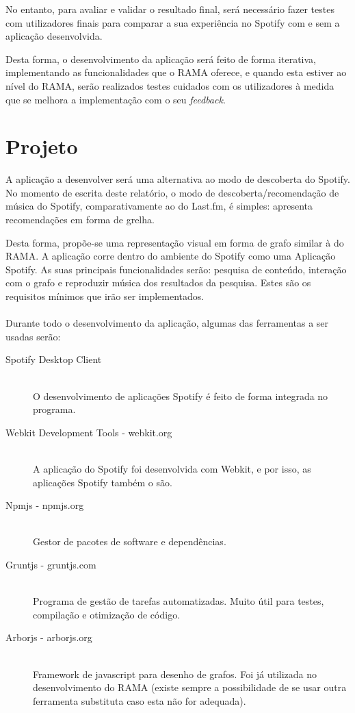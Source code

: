 No entanto, para avaliar e validar o resultado final, será necessário fazer testes com utilizadores finais para comparar a sua experiência no Spotify com e sem a aplicação desenvolvida.

Desta forma, o desenvolvimento da aplicação será feito de forma iterativa, implementando as funcionalidades que o RAMA oferece, e quando esta estiver ao nível do RAMA, serão realizados testes cuidados com os utilizadores à medida que se melhora a implementação com o seu \emph{feedback}.

\section{Projeto} \label{sec:proj}

A aplicação a desenvolver será uma alternativa ao modo de descoberta do Spotify.
No momento de escrita deste relatório, o modo de descoberta/recomendação de música do Spotify, comparativamente ao do Last.fm, é simples: apresenta recomendações em forma de grelha.

Desta forma, propõe-se uma representação visual em forma de grafo similar à do RAMA.
A aplicação corre dentro do ambiente do Spotify como uma Aplicação Spotify.
As suas principais funcionalidades serão: pesquisa de conteúdo, interação com o grafo e reproduzir música dos resultados da pesquisa.
Estes são os requisitos mínimos que irão ser implementados.
\\
\\
Durante todo o desenvolvimento da aplicação, algumas das ferramentas a ser usadas serão:

\begin{description}
  \item[Spotify Desktop Client] \hfill \\
    O desenvolvimento de aplicações Spotify é feito de forma integrada no programa.
  \item[Webkit Development Tools - webkit.org] \hfill \\
    A aplicação do Spotify foi desenvolvida com Webkit, e por isso, as aplicações Spotify também o são.
  \item[Npmjs - npmjs.org] \hfill \\
    Gestor de pacotes de software e dependências.
  \item[Gruntjs - gruntjs.com] \hfill \\
    Programa de gestão de tarefas automatizadas. Muito útil para testes, compilação e otimização de código.
  \item[Arborjs - arborjs.org] \hfill \\
    Framework de javascript para desenho de grafos. Foi já utilizada no desenvolvimento do RAMA (existe sempre a possibilidade de se usar outra ferramenta substituta caso esta não for adequada).
\end{description}



